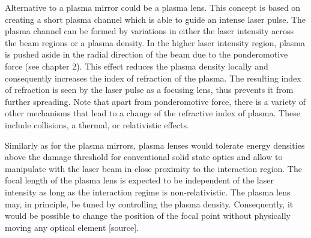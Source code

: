 Alternative to a plasma mirror could be a plasma lens. This concept is based on creating a short plasma channel which is able to guide an intense laser pulse. The plasma channel can be formed by variations in either the laser intensity across the beam regions or a plasma density. In the higher laser intensity region, plasma is pushed aside in the radial direction of the beam due to the ponderomotive force (see chapter 2). This effect reduces the plasma density locally and consequently increases the index of refraction of the plasma. The resulting index of refraction is seen by the laser pulse as a focusing lens, thus prevents it from further spreading. Note that apart from ponderomotive force, there is a variety of other mechanisms that lead to a change of the refractive index of plasma. These include collisions, a thermal, or relativistic effects.

Similarly as for the plasma mirrors, plasma lenses would tolerate energy densities above the damage threshold for conventional solid state optics and allow to manipulate with the laser beam in close proximity to the interaction region. The focal length of the plasma lens is expected to be independent of the laser intensity as long as the interaction regime is non-relativistic. The plasma lens may, in principle, be tuned by controlling the plasma density. Consequently, it would be possible to change the position of the focal point without physically moving any optical element [source].